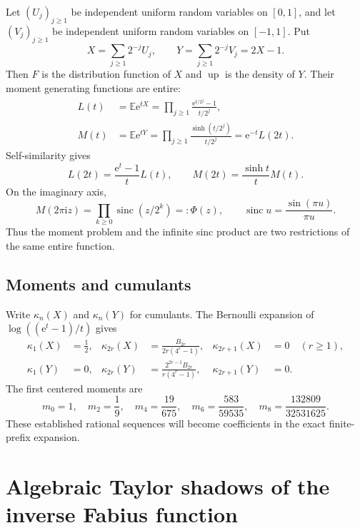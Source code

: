 \documentclass[11pt,oneside]{article}
\theoremstyle{frontier}
\theoremstyle{definition}
\theoremstyle{remark}
\newcommand{\e}{\mathrm e}
\newcommand{\ii}{\mathrm i}
\newcommand{\Up}{\operatorname{up}}
\newcommand{\sinc}{\operatorname{sinc}}
\begin{document}
Let $(U_j)_{j\ge1}$ be independent uniform random variables on $[0,1]$, and let
$(V_j)_{j\ge1}$ be independent uniform random variables on $[-1,1]$.  Put
\begin{equation}
 X=\sum_{j\ge1}2^{-j}U_j,
 \qquad
 Y=\sum_{j\ge1}2^{-j}V_j=2X-1.
 \label{eq:XY-series}
\end{equation}
Then $F$ is the distribution function of $X$ and $\Up$ is the density of $Y$.  Their moment
generating functions are entire:
\begin{align}
 L(t)&=\mathbb E\e^{tX}
 =\prod_{j\ge1}\frac{\e^{t/2^j}-1}{t/2^j},
 \label{eq:L-def}\\
 M(t)&=\mathbb E\e^{tY}
 =\prod_{j\ge1}\frac{\sinh(t/2^j)}{t/2^j}
 =\e^{-t}L(2t).
 \label{eq:M-def}
\end{align}
Self-similarity gives
\begin{equation}
 L(2t)=\frac{\e^t-1}{t}L(t),
 \qquad
 M(2t)=\frac{\sinh t}{t}M(t).
 \label{eq:mgf-refinement}
\end{equation}
On the imaginary axis,
\begin{equation}
 M(2\pi\ii z)=\prod_{k\ge0}\sinc(z/2^k)=:\Phi(z),
 \qquad \sinc u=\frac{\sin(\pi u)}{\pi u}.
 \label{eq:M-Phi}
\end{equation}
Thus the moment problem and the infinite sinc product are two restrictions of the same entire
function.

\subsection{Moments and cumulants}

Write $\kappa_n(X)$ and $\kappa_n(Y)$ for cumulants.  The Bernoulli expansion of
$\log((\e^t-1)/t)$ gives
\begin{align}
 \kappa_1(X)&=\frac12,
 &\kappa_{2r}(X)&=\frac{B_{2r}}{2r(4^r-1)},
 &\kappa_{2r+1}(X)&=0\quad(r\ge1),
 \label{eq:X-cumulants}\\
 \kappa_1(Y)&=0,
 &\kappa_{2r}(Y)&=\frac{2^{2r-1}B_{2r}}{r(4^r-1)},
 &\kappa_{2r+1}(Y)&=0.
 \label{eq:Y-cumulants}
\end{align}
The first centered moments are
\begin{equation}
 m_0=1,
 \quad m_2=\frac19,
 \quad m_4=\frac{19}{675},
 \quad m_6=\frac{583}{59535},
 \quad m_8=\frac{132809}{32531625}.
 \label{eq:Y-moments}
\end{equation}
These established rational sequences will become coefficients in the exact finite-prefix expansion.

\section{Algebraic Taylor shadows of the inverse Fabius function}
\label{sec:inverse-germs}
\end{document}
